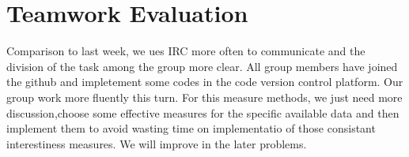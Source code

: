 \section{Teamwork Evaluation}
Comparison to last week, we ues IRC more often to communicate and the division of the task among the group more clear. All group members have joined the github and impletement some codes in the code version control platform. Our group work more fluently this turn. For this measure methods, we just need more discussion,choose some effective measures for the specific available data and then implement them to avoid wasting time on implementatio of those consistant interestiness measures. We will improve in the later problems.
